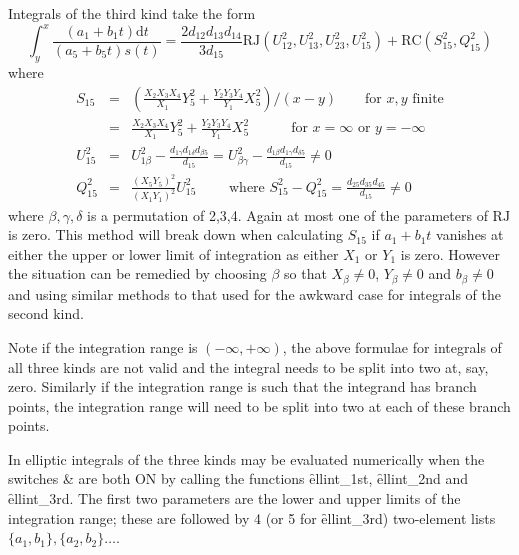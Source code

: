 Integrals of the third kind take the form
\[\int_y^x\frac{(a_1+b_1t)\mathrm{d}t}{(a_5+b_5t)s(t)} = \frac{2d_{12}d_{13}
d_{14}}{3d_{15}}\mathrm{RJ}(U_{12}^2, U_{13}^2, U_{23}^2,U_{15}^2) +
\mathrm{RC}(S_{15}^2,Q_{15}^2)\]
where
\begin{eqnarray*}
S_{15}  &=& \left(\frac{X_2X_3X_4}{X_1}Y_5^2+\frac{Y_2Y_3Y_4}{Y_1}X_5^2\right)/(x-y) \qquad
\mbox{for }x,y\mbox{ finite}\\
&=& \frac{X_2X_3X_4}{X_1}Y_5^2+\frac{Y_2Y_3Y_4}{Y_1}X_5^2 \quad \qquad \mbox{for }
x = \infty \mbox{ or } y = -\infty \\
U_{15}^2 &=& U_{1\beta}^2-\frac{d_{1\gamma}d_{1\delta}d_{\beta 5}}{d_{15}}
= U_{\beta\gamma}^2-\frac{d_{1\beta}d_{1\gamma}d_{\delta 5}}{d_{15}} \neq 0\\
Q_{15}^2 &=& \frac{(X_5Y_5)^2}{(X_1Y_1)^2}U_{15}^2\qquad\mbox{ where }
S_{15}^2-Q_{15}^2 = \frac{d_{25}d_{35}d_{45}}{d_{15}} \neq 0
\end{eqnarray*}
where $\beta,\gamma,\delta$ is a permutation of 2,3,4. Again at most one of the
parameters of $\mathrm{RJ}$ is zero. This method will break down when calculating
$S_{15}$ if $a_1+b_1t$ vanishes at either the upper or lower limit of integration as
either $X_1$ or $Y_1$ is zero. However the situation can be remedied by choosing $\beta$
so that $X_\beta \neq 0$, $Y_\beta \neq 0$ and $b_\beta \neq 0$ and using similar
methods to that used for the awkward case for integrals of the second kind.

Note if the integration range is $(-\infty, +\infty)$, the above formulae for
integrals of all three kinds are not valid and the integral needs to be split
into two at, say, zero.
Similarly if the integration range is such that the integrand has branch points,
the integration range will need to be split into two at each of these branch
points.

In \REDUCE elliptic integrals of the three kinds may be evaluated numerically
when the switches  \&  are both ON by calling the functions
\f{ellint\_1st},  \f{ellint\_2nd} and \f{ellint\_3rd}. The first two
parameters are the lower and upper limits of the integration range; these are
followed by 4 (or 5 for \f{ellint\_3rd}) two-element lists
$\{a_1,b_1\}, \{a_2,b_2\} \ldots$.


